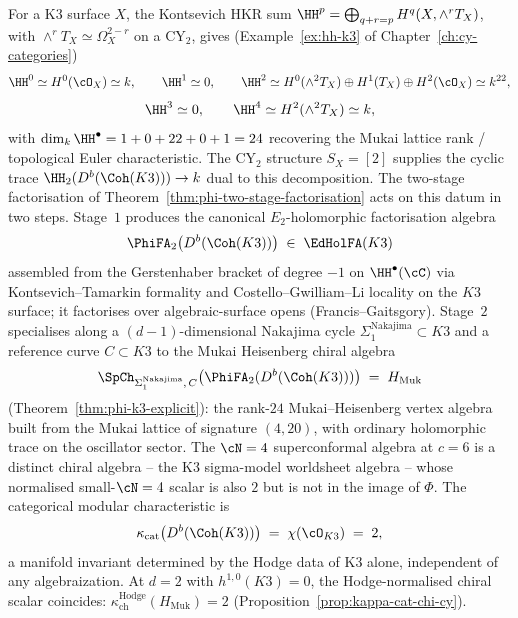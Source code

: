 \begin{example}[K3 surfaces, \texorpdfstring{$d = 2$}{d = 2}]
\label{ex:k3-derived}
For a K3 surface $X$, the Kontsevich HKR sum $\HH^p = \bigoplus_{q+r=p} H^q(X, \wedge^r T_X)$, with $\wedge^r T_X \simeq \Omega^{2-r}_X$ on a CY$_2$, gives (Example~\ref{ex:hh-k3} of Chapter~\ref{ch:cy-categories})
\[
 \HH^0 \simeq H^0(\cO_X) \simeq k, \qquad
 \HH^1 \simeq 0, \qquad
 \HH^2 \simeq H^0(\wedge^2 T_X) \oplus H^1(T_X) \oplus H^2(\cO_X) \simeq k^{22},
\]
\[
 \HH^3 \simeq 0, \qquad \HH^4 \simeq H^2(\wedge^2 T_X) \simeq k,
\]
with $\dim_k \HH^\bullet = 1 + 0 + 22 + 0 + 1 = 24$ recovering the Mukai lattice rank / topological Euler characteristic. The CY$_2$ structure $S_X = [2]$ supplies the cyclic trace $\HH_2(D^b(\Coh(K3))) \to k$ dual to this decomposition. The two-stage factorisation of Theorem~\ref{thm:phi-two-stage-factorisation} acts on this datum in two steps. Stage~$1$ produces the canonical $E_2$-holomorphic factorisation algebra
\[
 \PhiFA_2\bigl(D^b(\Coh(K3))\bigr) \;\in\; \EdHolFA(K3)
\]
assembled from the Gerstenhaber bracket of degree $-1$ on $\HH^\bullet(\cC)$ via Kontsevich--Tamarkin formality and Costello--Gwilliam--Li locality on the $K3$ surface; it factorises over algebraic-surface opens (Francis--Gaitsgory). Stage~$2$ specialises along a $(d{-}1)$-dimensional Nakajima cycle $\Sigma_1^{\mathrm{Nakajima}} \subset K3$ and a reference curve $C \subset K3$ to the Mukai Heisenberg chiral algebra
\[
 \SpCh_{\Sigma_1^{\mathrm{Nakajima}},\, C}\bigl(\PhiFA_2(D^b(\Coh(K3)))\bigr) \;=\; H_{\mathrm{Muk}}
\]
(Theorem~\ref{thm:phi-k3-explicit}): the rank-$24$ Mukai--Heisenberg vertex algebra built from the Mukai lattice of signature $(4,20)$, with ordinary holomorphic trace on the oscillator sector. The $\cN=4$ superconformal algebra at $c = 6$ is a distinct chiral algebra -- the K3 sigma-model worldsheet algebra -- whose normalised small-$\cN=4$ scalar is also $2$ but is not in the image of $\Phi$. The categorical modular characteristic is
\[
 \kappa_{\mathrm{cat}}\bigl(D^b(\Coh(K3))\bigr) \;=\; \chi(\cO_{K3}) \;=\; 2,
\]
a manifold invariant determined by the Hodge data of K3 alone, independent of any algebraization. At $d = 2$ with $h^{1,0}(K3) = 0$, the Hodge-normalised chiral scalar coincides: $\kappa_{\mathrm{ch}}^{\mathrm{Hodge}}(H_{\mathrm{Muk}}) = 2$ (Proposition~\ref{prop:kappa-cat-chi-cy}).
\end{example}


